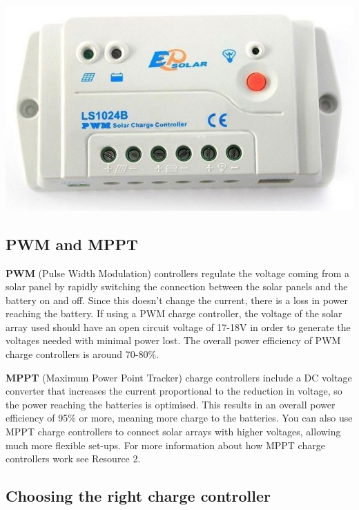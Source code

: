 \documentclass{article}
\theoremstyle{definition}
\theoremstyle{definition}
\theoremstyle{remark}
\begin{document}
  \begin{center}
    \includegraphics[width=0.25\paperwidth]{../Images/image_6_1_(charge_controller).png}
  \end{center}

  \subsection{PWM and MPPT} %
  \label{sub:pwm_and_mppt}

    \textbf{PWM} (Pulse Width Modulation) controllers regulate the voltage coming from a solar panel by rapidly switching the connection between the solar panels and the battery on and off. Since this doesn’t change the current, there is a loss in power reaching the battery. If using a PWM charge controller, the voltage of the solar array used should have an open circuit voltage of 17-18V in order to generate the voltages needed with minimal power lost. The overall power efficiency of PWM charge controllers is around 70-80\%.

    \textbf{MPPT} (Maximum Power Point Tracker) charge controllers include a DC voltage converter that increases the current proportional to the reduction in voltage, so the power reaching the batteries is optimised. This results in an overall power efficiency of 95\% or more, meaning more charge to the batteries. You can also use MPPT charge controllers to connect solar arrays with higher voltages, allowing much more flexible set-ups. For more information about how MPPT charge controllers work see Resource 2.
  

  \subsection{Choosing the right charge controller} %
  \label{sub:choosing_the_right_charge_controller}
\end{document}

